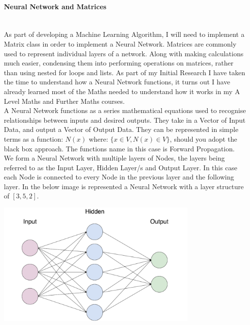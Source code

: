 \begin{flushleft}
                    \paragraph{Neural Network and Matrices} \mbox{} \\
                        As part of developing a Machine Learning Algorithm, I will need to implement a Matrix class in order to
                        implement a Neural Network. Matrices are commonly used to represent individual layers of a network. Along
                        with making calculations much easier, condensing them into performing operations on matrices, rather than
                        using nested for loops and lists. As part of my Initial Research I have taken the time to understand
                        how a Neural Network functions, it turns out I have already learned most of the Maths needed to understand
                        how it works in my A Level Maths and Further Maths courses. \\
                        \vspace{0.2cm}
                        A Neural Network functions as a series mathematical equations used to recognise relationships between inputs
                        and desired outputs. They take in a Vector of Input Data, and output a Vector of Output Data. They can be represented
                        in simple terms as a function: $N(x)$ where: $\{x \in V, N(x) \in V\}$, should you adopt the black box approach. 
                        The functions name in this case is Forward Propagation. \\
                        \vspace{0.2cm}
                        We form a Neural Network with multiple layers of Nodes, the layers being referred to as the Input Layer, 
                        Hidden Layer/s and Output Layer. In this case each Node is connected to every Node in the previous layer and
                        the following layer. In the below image is represented a Neural Network with a layer structure of $[3, 5, 2]$.

                        \vspace{0.1cm}
                        \centerline{\includegraphics[width=10cm]{Images/InitialResearch/NeuralNetworkExample.png}}


\end{flushleft}
